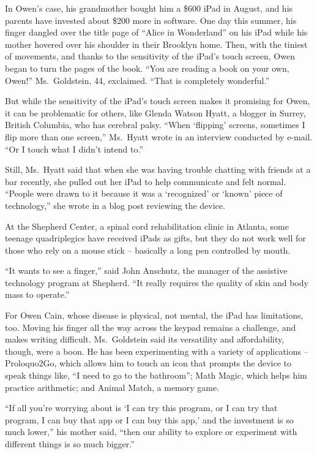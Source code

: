 ﻿\documentclass[12pt]{article}
\begin{document}
In Owen's case, his grandmother bought him a \$600 iPad in August, and his parents have invested
about \$200 more in software. One day this summer, his finger dangled over the title page of ``Alice
in Wonderland'' on his iPad while his mother hovered over his shoulder in their Brooklyn home. Then,
with the tiniest of movements, and thanks to the sensitivity of the iPad's touch screen, Owen began
to turn the pages of the book. ``You are reading a book on your own, Owen!'' Ms.~Goldstein, 44,
exclaimed. ``That is completely wonderful.''

But while the sensitivity of the iPad's touch screen makes it promising for Owen, it can be
problematic for others, like Glenda Watson Hyatt, a blogger in Surrey, British Columbia, who has
cerebral palsy. ``When `flipping' screens, sometimes I flip more than one screen,'' Ms.~Hyatt wrote
in an interview conducted by e-mail. ``Or I touch what I didn't intend to.''

Still, Ms.~Hyatt said that when she was having trouble chatting with friends at a bar recently, she
pulled out her iPad to help communicate and felt normal. ``People were drawn to it because it was a
`recognized' or `known' piece of technology,'' she wrote in a blog post reviewing the device.

At the Shepherd Center, a spinal cord rehabilitation clinic in Atlanta, some teenage quadriplegics
have received iPads as gifts, but they do not work well for those who rely on a mouse stick --
basically a long pen controlled by mouth.

``It wants to see a finger,'' said John Anschutz, the manager of the assistive technology program at
Shepherd. ``It really requires the quality of skin and body mass to operate.''

For Owen Cain, whose disease is physical, not mental, the iPad has limitations, too. Moving his
finger all the way across the keypad remains a challenge, and makes writing difficult. Ms.~Goldstein
said its versatility and affordability, though, were a boon. He has been experimenting with a
variety of applications -- Proloquo2Go, which allows him to touch an icon that prompts the device to
speak things like, ``I need to go to the bathroom''; Math Magic, which helps him practice
arithmetic; and Animal Match, a memory game.

``If all you're worrying about is `I can try this program, or I can try that program, I can buy that
app or I can buy this app,' and the investment is so much lower,'' his mother said, ``then our
ability to explore or experiment with different things is so much bigger.''
\end{document}
